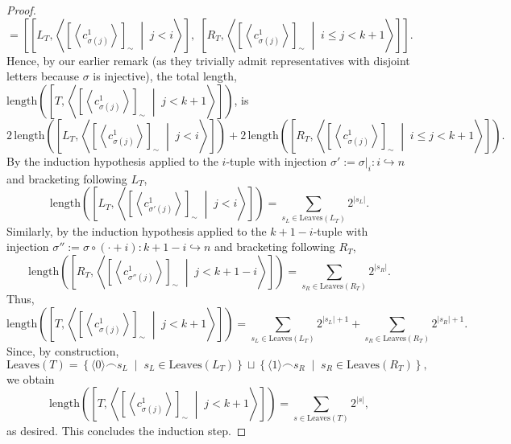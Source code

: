 \documentclass[11pt, a4paper, oneside]{article}
\theoremstyle{remark}
\theoremstyle{lemma}
\begin{document}
\begin{proof}
\[\]
\[
=\left[ 
\left[ L_T, \left\langle \left[ \left\langle c_{\sigma(j)}^1 \right\rangle \right]_{\sim} \;\middle|\; j<i \right\rangle \right], \;
\left[ R_T, \left\langle \left[ \left\langle c_{\sigma(j)}^1 \right\rangle \right]_{\sim} \;\middle|\; i\leq j<k+1 \right\rangle \right] 
\right].
\]
Hence, by our earlier remark (as they trivially admit representatives with disjoint letters because $\sigma$ is injective), the total length, \(\mathrm{length}\!\left(\left[T, \left\langle \left[ \left\langle c_{\sigma(j)}^1 \right\rangle \right]_{\sim} \;\middle|\; j<k+1 \right\rangle \right]\right)\), is 
\[
2 \, \mathrm{length}\!\left(\left[ L_T, \left\langle \left[ \left\langle c_{\sigma(j)}^1 \right\rangle \right]_{\sim} \;\middle|\; j<i \right\rangle \right]\right)
 + 2 \, \mathrm{length}\!\left(\left[ R_T, \left\langle \left[ \left\langle c_{\sigma(j)}^1 \right\rangle \right]_{\sim} \;\middle|\; i\leq j<k+1 \right\rangle \right]\right).
\]
By the induction hypothesis applied to the $i$-tuple with injection $\sigma':=\sigma|_i:i\hookrightarrow n$ and bracketing following \(L_T\),
\[
\mathrm{length}\!\left(\left[ L_T, \left\langle \left[ \left\langle c_{\sigma'(j)}^1 \right\rangle \right]_{\sim} \;\middle|\; j<i \right\rangle \right]\right)
= \sum_{s_L\in \mathrm{Leaves}(L_T)} 2^{|s_L|}.
\]
Similarly, by the induction hypothesis applied to the $k+1-i$-tuple with injection $\sigma'':=\sigma\circ(\cdot +i) :k+1-i\hookrightarrow n$ and bracketing following \(R_T\),
\[
\mathrm{length}\!\left(\left[ R_T, \left\langle \left[ \left\langle c_{\sigma''(j)}^1 \right\rangle \right]_{\sim} \;\middle|\; j<k+1-i\right\rangle \right]\right)
= \sum_{s_R\in \mathrm{Leaves}(R_T)} 2^{|s_R|}.
\]
Thus,
\[
\mathrm{length}\!\left(\left[T, \left\langle \left[ \left\langle c_{\sigma(j)}^1 \right\rangle \right]_{\sim} \;\middle|\; j<k+1 \right\rangle \right]\right)
= \sum_{s_L\in \mathrm{Leaves}(L_T)} 2^{|s_L|+1} + \sum_{s_R\in \mathrm{Leaves}(R_T)} 2^{|s_R|+1}.
\]
Since, by construction,
\[
\mathrm{Leaves}(T) = \left\{ \langle 0 \rangle \frown s_L \;\middle|\; s_L \in \mathrm{Leaves}(L_T)\right\}\sqcup \left\{ \langle 1 \rangle \frown s_R \;\middle|\; s_R \in \mathrm{Leaves}(R_T)\right\},
\]
we obtain
\[
\mathrm{length}\!\left(\left[T, \left\langle \left[ \left\langle c_{\sigma(j)}^1 \right\rangle \right]_{\sim} \;\middle|\; j<k+1 \right\rangle \right]\right)
= \sum_{s\in \mathrm{Leaves}(T)} 2^{|s|},
\]
as desired. This concludes the induction step.
\end{proof}
\end{document}
